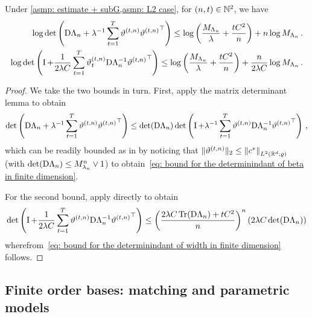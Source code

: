 \begin{lemma}\label{lemma: bounds for the determinants in finite dimension}
    Under \cref{asmp: estimate + subG,asmp: L2 case}, for $(n,t)\in\mathbb{N}^2$, we have
    \begin{align}
        \log\det\left(\mathrm{D}\Lambda_n+\lambda^{-1}\sum_{t=1}^T \vartheta^{(t,n)}{\vartheta^{(t,n)}}^\top\right)\le \log\left(\frac{M_{\Lambda_n}}\lambda + \frac{t C^2}n\right)+n\log M_{\Lambda_n}\,.\label{eq: bound for the determinindant of beta in finite dimension}\\
        \log\det\left(\operatorname{\boldmath{I}}+\frac{1}{2\lambda C}\sum_{t=1}^T \vartheta^{(t,n)}_t\mathrm{D}\Lambda_n^{-1}{\vartheta^{(t,n)}}^\top\right)\le \log\left(\frac{M_{\Lambda_n}}\lambda + \frac{t C^2}n\right)+\frac{n}{2\lambda C}\log M_{\Lambda_n}\,.
        \label{eq: bound for the determinindant of width in finite dimension}
    \end{align}
\end{lemma}

\begin{proof}
    We take the two bounds in turn. First, apply the matrix determinant lemma to obtain
    \[
        \det\left(\mathrm{D}\Lambda_n+\lambda^{-1}\sum_{t=1}^T \vartheta^{(t,n)}{\vartheta^{(t,n)}}^\top\right)\le \det(\mathrm{D}\Lambda_n)\det\left(\operatorname{\boldmath{I}}+\lambda^{-1}\sum_{t=1}^T \vartheta^{(t,n)}\mathrm{D}\Lambda_n^{-1}{\vartheta^{(t,n)}}^\top\right)\,,
    \]
    which can be readily bounded as in \citep[Lemma E.3]{abbasi-yadkori_online_2012} by noticing that $\lVert\vartheta^{(t,n)}\rVert_2\le\left\lVert c^*\right\rVert_{L^2(\mathbb{R}^d;\varrho)}$ (with $\det(\mathrm{D}\Lambda_n)\le M_{\lambda_n}^n\vee 1$) to obtain~\eqref{eq: bound for the determinindant of beta in finite dimension}.

    For the second bound, apply \citep[Lemma E.3]{abbasi-yadkori_online_2012} directly to obtain
    \begin{align}
        \det\left(\operatorname{\boldmath{I}}+\frac{1}{2\lambda C}\sum_{t=1}^T \vartheta^{(t,n)}\mathrm{D}\Lambda_n^{-1}{\vartheta^{(t,n)}}^\top\right) \le {\left(\frac{2\lambda C\operatorname{Tr}(\mathrm{D}\Lambda_n)+tC^2 }n\right)}^n\left(2\lambda C\det(\mathrm{D}\Lambda_n)\right)\notag
    \end{align}
    wherefrom~\eqref{eq: bound for the determinindant of width in finite dimension} follows.
\end{proof}


\subsection{Finite order bases: matching and parametric models}\label{subsubsec: parametric rate /matching}


